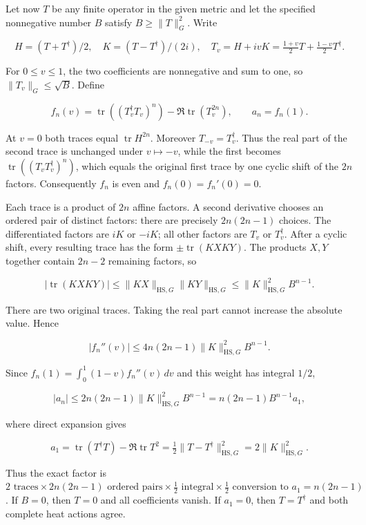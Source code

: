 \documentclass[11pt]{article}
\begin{document}
Let now \(T\) be any finite operator in the given metric and let the specified nonnegative number \(B\) satisfy \(B\ge\|T\|_G^2\). Write

\[
H=(T+T^\dagger)/2,\quad K=(T-T^\dagger)/(2i),\quad
T_v=H+ivK=\tfrac{1+v}{2}T+\tfrac{1-v}{2}T^\dagger.
\]

For \(0\le v\le1\), the two coefficients are nonnegative and sum to one, so \(\|T_v\|_G\le\sqrt B\). Define

\[
f_n(v)=\operatorname{tr}((T_v^\dagger T_v)^n)
-\Re\operatorname{tr}(T_v^{2n}),\qquad a_n=f_n(1).
\]

At \(v=0\) both traces equal \(\operatorname{tr}H^{2n}\). Moreover \(T_{-v}=T_v^\dagger\). Thus the real part of the second trace is unchanged under \(v\mapsto-v\), while the first becomes \(\operatorname{tr}((T_vT_v^\dagger)^n)\), which equals the original first trace by one cyclic shift of the \(2n\) factors. Consequently \(f_n\) is even and \(f_n(0)=f_n'(0)=0\).

Each trace is a product of \(2n\) affine factors. A second derivative chooses an ordered pair of distinct factors: there are precisely \(2n(2n-1)\) choices. The differentiated factors are \(iK\) or \(-iK\); all other factors are \(T_v\) or \(T_v^\dagger\). After a cyclic shift, every resulting trace has the form \(\pm\operatorname{tr}(KXKY)\). The products \(X,Y\) together contain \(2n-2\) remaining factors, so

\[
|\operatorname{tr}(KXKY)|
\le\|KX\|_{\mathrm{HS},G}\|KY\|_{\mathrm{HS},G}
\le\|K\|_{\mathrm{HS},G}^2 B^{n-1}.
\]

There are two original traces. Taking the real part cannot increase the absolute value. Hence

\[
|f_n''(v)|\le4n(2n-1)\|K\|_{\mathrm{HS},G}^2B^{n-1}.
\]

Since \(f_n(1)=\int_0^1(1-v)f_n''(v)\,dv\) and this weight has integral \(1/2\),

\[
|a_n|\le2n(2n-1)\|K\|_{\mathrm{HS},G}^2B^{n-1}
=n(2n-1)B^{n-1}a_1, \tag{ID3.1}
\]

where direct expansion gives

\[
a_1=\operatorname{tr}(T^\dagger T)-\Re\operatorname{tr}T^2
=\tfrac12\|T-T^\dagger\|_{\mathrm{HS},G}^2
=2\|K\|_{\mathrm{HS},G}^2. \tag{ID3.2}
\]

Thus the exact factor is \(2\text{ traces}\times2n(2n-1)\text{ ordered pairs}\times
\tfrac12\text{ integral}\times\tfrac12\text{ conversion to }a_1
=n(2n-1)\). If \(B=0\), then \(T=0\) and all coefficients vanish. If \(a_1=0\), then \(T=T^\dagger\) and both complete heat actions agree.
\end{document}
